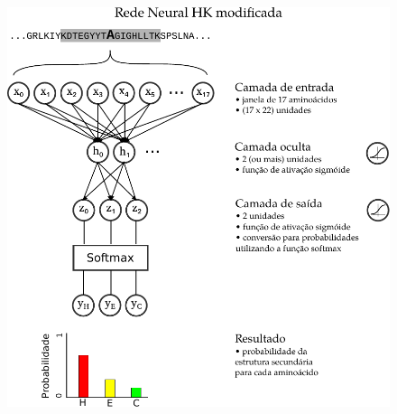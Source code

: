 \begin{figure}
    \includegraphics[width=\linewidth]{../figures/neural_network_HK_similar.pdf}
    \caption{}
    \label{fig:neural_network_HK_similar}
\end{figure}